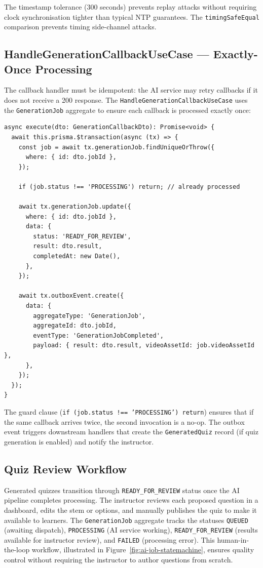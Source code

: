 The timestamp tolerance (300 seconds) prevents replay attacks without requiring clock synchronisation tighter than typical NTP guarantees. The \texttt{timingSafeEqual} comparison prevents timing side-channel attacks.

\subsection{HandleGenerationCallbackUseCase --- Exactly-Once Processing}

The callback handler must be idempotent: the AI service may retry callbacks if it does not receive a 200 response. The \texttt{HandleGenerationCallbackUseCase} uses the \texttt{GenerationJob} aggregate to ensure each callback is processed exactly once:

\begin{lstlisting}[caption=Exactly-Once Callback Processing,label=lst:exactly-once]
async execute(dto: GenerationCallbackDto): Promise<void> {
  await this.prisma.$transaction(async (tx) => {
    const job = await tx.generationJob.findUniqueOrThrow({
      where: { id: dto.jobId },
    });

    if (job.status !== 'PROCESSING') return; // already processed

    await tx.generationJob.update({
      where: { id: dto.jobId },
      data: {
        status: 'READY_FOR_REVIEW',
        result: dto.result,
        completedAt: new Date(),
      },
    });

    await tx.outboxEvent.create({
      data: {
        aggregateType: 'GenerationJob',
        aggregateId: dto.jobId,
        eventType: 'GenerationJobCompleted',
        payload: { result: dto.result, videoAssetId: job.videoAssetId },
      },
    });
  });
}
\end{lstlisting}

The guard clause (\texttt{if (job.status !== 'PROCESSING') return}) ensures that if the same callback arrives twice, the second invocation is a no-op. The outbox event triggers downstream handlers that create the \texttt{GeneratedQuiz} record (if quiz generation is enabled) and notify the instructor.

\subsection{Quiz Review Workflow}

Generated quizzes transition through \texttt{READY\_FOR\_REVIEW} status once the AI pipeline completes processing. The instructor reviews each proposed question in a dashboard, edits the stem or options, and manually publishes the quiz to make it available to learners. The \texttt{GenerationJob} aggregate tracks the statuses \texttt{QUEUED} (awaiting dispatch), \texttt{PROCESSING} (AI service working), \texttt{READY\_FOR\_REVIEW} (results available for instructor review), and \texttt{FAILED} (processing error). This human-in-the-loop workflow, illustrated in Figure~\ref{fig:ai-job-statemachine}, ensures quality control without requiring the instructor to author questions from scratch.

